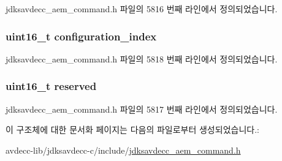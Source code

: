 jdksavdecc\+\_\+aem\+\_\+command.\+h 파일의 5816 번째 라인에서 정의되었습니다.

\subsubsection[{\texorpdfstring{configuration\+\_\+index}{configuration_index}}]{\setlength{\rightskip}{0pt plus 5cm}uint16\+\_\+t configuration\+\_\+index}\hypertarget{structjdksavdecc__aem__command__set__configuration__response_afaad1bd7c66f9611e134d8c5ce98f444}{}\label{structjdksavdecc__aem__command__set__configuration__response_afaad1bd7c66f9611e134d8c5ce98f444}


jdksavdecc\+\_\+aem\+\_\+command.\+h 파일의 5818 번째 라인에서 정의되었습니다.

\subsubsection[{\texorpdfstring{reserved}{reserved}}]{\setlength{\rightskip}{0pt plus 5cm}uint16\+\_\+t reserved}\hypertarget{structjdksavdecc__aem__command__set__configuration__response_a5a6ed8c04a3db86066924b1a1bf4dad3}{}\label{structjdksavdecc__aem__command__set__configuration__response_a5a6ed8c04a3db86066924b1a1bf4dad3}


jdksavdecc\+\_\+aem\+\_\+command.\+h 파일의 5817 번째 라인에서 정의되었습니다.



이 구조체에 대한 문서화 페이지는 다음의 파일로부터 생성되었습니다.\+:\begin{DoxyCompactItemize}
\item 
avdecc-\/lib/jdksavdecc-\/c/include/\hyperlink{jdksavdecc__aem__command_8h}{jdksavdecc\+\_\+aem\+\_\+command.\+h}\end{DoxyCompactItemize}
